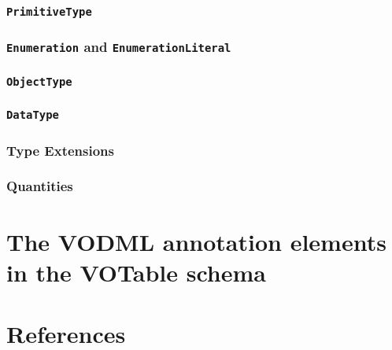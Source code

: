 \documentclass[11pt,a4paper]{ivoa}
\begin{document}
\subsubsection{\textbf{\texttt{PrimitiveType}}}\label{primitivetype}

\subsubsection{\textbf{\texttt{Enumeration}} and
\textbf{\texttt{EnumerationLiteral}}}\label{enumeration-and-enumerationliteral}

\subsubsection{\textbf{\texttt{ObjectType}}}\label{objecttype}

\subsubsection{\textbf{\texttt{DataType}}}\label{datatype}

\subsubsection{Type Extensions}\label{type-extensions}

\subsubsection{Quantities}\label{quantities}

\section{The VODML annotation elements in the VOTable schema}\label{sec:schema}

\section{References}\label{references}
\end{document}
